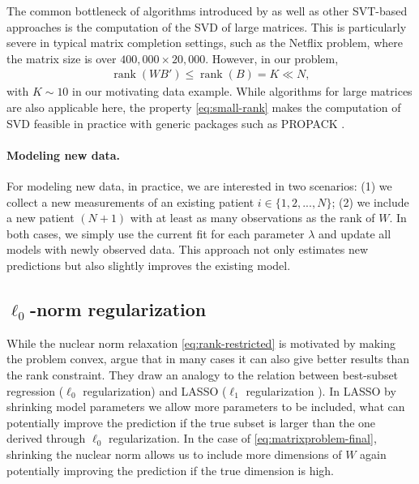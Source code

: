 \documentclass[preprint]{imsart}
\numberwithin{equation}{section}
\theoremstyle{plain}
\newcommand{\tr}[1]{{\textcolor{red}{#1}}}
\DeclareMathOperator*{\rank}{rank}
\begin{document}
The common bottleneck of algorithms introduced by \citet{cai2010singular,mazumder2010spectral,ma2011fixed} as well as other SVT-based approaches is the computation of the SVD of large matrices. This is particularly severe in typical matrix completion settings, such as the Netflix problem, where the matrix size is over $400{,}000 \times 20{,}000$. However, in our problem,
\begin{align}\label{eq:small-rank}
  \rank(WB') \leq \rank(B) = K \ll N,
\end{align}
with $K \sim 10$ in our motivating data example. While algorithms for large matrices are also applicable here, the property \eqref{eq:small-rank} makes the computation of SVD feasible in practice with generic packages such as PROPACK \citep{larsen2004propack}.

\paragraph{Modeling new data.}

For modeling new data, in practice, we are interested in two scenarios: (1) we collect a new measurements of an existing patient $i \in \{1,2,...,N\}$; (2) we include a new patient $(N+1)$ with at least as many observations as the rank of $W$. In both cases, we simply use the current fit for each parameter $\lambda$ and update all models with newly observed data. This approach not only estimates new predictions but also slightly improves the existing model. 




\subsection{$\ell_0$-norm regularization}

While the nuclear norm relaxation \eqref{eq:rank-restricted} is motivated by making the problem convex, \citet{mazumder2010spectral} argue that in many cases it can also give better results than the rank constraint. They draw an analogy to the relation between best-subset regression ($\ell_0$ regularization) and LASSO ($\ell_1$ regularization \citep{tibshirani1996regression, friedman2001elements}). In LASSO by shrinking model parameters we allow more parameters to be included, what can potentially improve the prediction if the true subset is larger than the one derived through $\ell_0$ regularization. In the case of \eqref{eq:matrixproblem-final}, shrinking the nuclear norm allows us to include more dimensions of $W$ again potentially improving the prediction if the true dimension is high.
\end{document}
